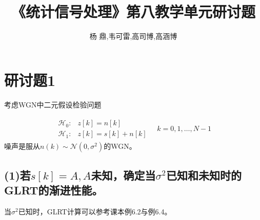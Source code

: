 \documentclass[fontset=windows]{article}
\title{\heiti\zihao{2} 《统计信号处理》第八教学单元研讨题}
\author{杨 鼎,韦可雷,高司博,高涵博}
\date{}
\numberwithin{figure}{section}
\begin{document}
\maketitle
\thispagestyle{empty}



\section{研讨题1}
考虑WGN中二元假设检验问题

\begin{align*}
    \begin{matrix}
        \mathcal{H}_0: & z[k]=n[k]      \\
        \mathcal{H}_1: & z[k]=s[k]+n[k]
    \end{matrix}\quad k=0,1,\ldots,N-1
\end{align*}
噪声是服从\(n(k)\sim \mathcal{N}(0,\sigma^2)\)的WGN。

\subsection*{(1)若\(s[k]=A,A\)未知，确定当\(\sigma^2\)已知和未知时的GLRT的渐进性能。}

当\(\sigma^2\)已知时，GLRT计算可以参考课本例6.2与例6.4。
\end{document}
